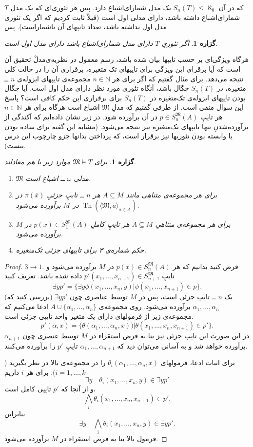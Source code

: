 \documentclass[12pt,a4paper]{article}
\theoremstyle{colorhead}
\newtheorem{prop}[thm]{گزاره}
\DeclareMathOperator{\Th}{Th}
\begin{document}
$T$
که در آن
$S_n(T)\leq \aleph_0$
یک مدل شمارای‌اشباع دارد. پس هر تئوری‌ای که یک مدل شمارای‌اشباع داشته باشد، 
دارای مدلی اول است (قبلاً ثابت کردیم که اگر یک تئوری
مدل اول نداشته باشد، تعداد تایپهای آن ناشماراست). پس
\begin{prop}
اگر
تئوریِ
$T$
دارای مدل شمارای‌اشباع باشد 
دارای مدل اول است.
\end{prop}
هرگاه ویژگی‌ای بر حسب تایپها بیان شده باشد، 
رسم معمول در نظریه‌ی‌مدلْ تحقیق آن است که
آیا
برقرای این ویژگی 
برای تایپهای تک متغیره، برقراری آن را در حالت کلی  نتیجه می‌دهد. برای مثال گفتیم که
اگر برای
هر
$n\in \mathbb{N}$
مجموعه‌ی
تایپهای ایزوله‌ی
$n$
ــ
متغیره‌، در
$S_n(T)$
چگال باشد، آنگاه تئوری مورد نظر دارای مدل اول است. آیا 
چگال بودن تایپهای ایزوله‌ی تک‌متغیره‌ در
$S_n(T)$
برای برقراری  این حکم کافی است؟ پاسخ این سوال منفی است. از طرفی گفتیم که مدلِ
$\mathfrak{M}$
اشباع است هرگاه برای هر
$n\in \mathbb{N}$
هر تایپِ
$p\in S_n^\mathfrak{M}(A)$
در آن برآورده شود. در زیر نشان داده‌ایم
که آکندگی از برآورده‌شدنِ تنها تایپهای تک‌متغیره نیز نتیجه می‌شود.
(مشابه این گفته برای ساده بودن یا وابسته بودن تئوریها نیز برقرار است، که پرداختن بدانها جزو چارچوب این درس نیست).
\begin{prop}
برای
$\mathfrak{M}\models T$
موارد زیر با هم معادلند.
\begin{enumerate}
\item
$\mathfrak{M}$
مدلی 
$\omega$ 
ــ 
اشباع است.
\item
برای هر مجموعه‌ی متناهی مانند
$A\subseteq M$
هر
$n$ ــ
تایپِ جزئیِ
$\pi(\bar{x})$
در
$\Th(\langle\mathfrak{M},a\rangle_{a\in  A})$
در
$M$
برآورده می‌شود.
\item
برای هر مجموعه‌ی متناهیِ
$A\subseteq M$
هر تایپِ کاملِ
$p(x)\in S_1^\mathfrak{M}(A)$
در
$M$
برآورده می‌شود.
\item 
حکم شماره‌ی ۳ برای تایپهای جزئی تک‌متغیره.
\end{enumerate}
\end{prop}
\begin{proof}
$3\to 1$.
فرض کنید 
بدانیم که
هر
$p(\bar{x})\in S_n^{\mathfrak{M}}(A)$
در
$M$
برآورده می‌شود و تایپِ
$p'(x_1,\ldots,x_{n+1})\in S_{n+1}^{\mathfrak{M}}$
داده شده باشد. تعریف کنید
\[
\exists y p'=\{\exists y \phi(x_1,\ldots,x_{n}, y)| \phi(x_1,\ldots,x_{n+1})\in p\}.
\]
(بررسی کنید که)
$\exists y p'$
یک
$n$ ــ
تایپ جزئی است، پس در
$M$
توسط عناصری چون
$\alpha_1,\ldots,\alpha_n$
برآورده می‌شود. روی مجموعه‌ی
$A\cup \{\alpha_1,\ldots,\alpha_n\}$
ادعا می‌کنیم که مجموعه‌ی زیر از فرمولهای دارای یک متغیر واحد تایپی جزئی است.
\[
p'(\bar{\alpha},x)=\{\theta(\alpha_1,\ldots,\alpha_n,x))|\theta(x_1,\ldots,x_n,x_{n+1})\in p'\}.
\]
در این صورت
این تایپ جزئی نیز بنا به فرض استقراء در
$M$
توسط عنصری چون
$\alpha_{n+1}$
برآورده خواهد شد و به آسانی می‌توان دید که 
$\alpha_1,\ldots,\alpha_{n+1}$
تایپِ
$p'$
را برآورده می‌کنند. 
\par 
برای اثبات ادعا، فرمولهای
$\theta_i(\alpha_1,\ldots,\alpha_n,x)$
را در مجموعه‌ی بالا در نظر بگیرید
 (\mbox{$i=1,\ldots,k$}).
برای هر
$i$
داریم
\[\exists y\quad \theta_i(x_1,\ldots,x_n,y)\in \exists y p'\]
و
از آنجا که 
$p'$
تایپی کامل است،
\[
\bigwedge_i \theta_i (x_1,\ldots,x_n,x_{n+1})\in p'.
\]
بنابراین
\[
\exists y\quad \bigwedge_i \theta_i(x_1,\ldots,x_n,y)\in \exists y p'.
\]
فرمول بالا بنا به فرض استقراء در
$M$
برآورده می‌شود.
\end{proof}
\end{document}
